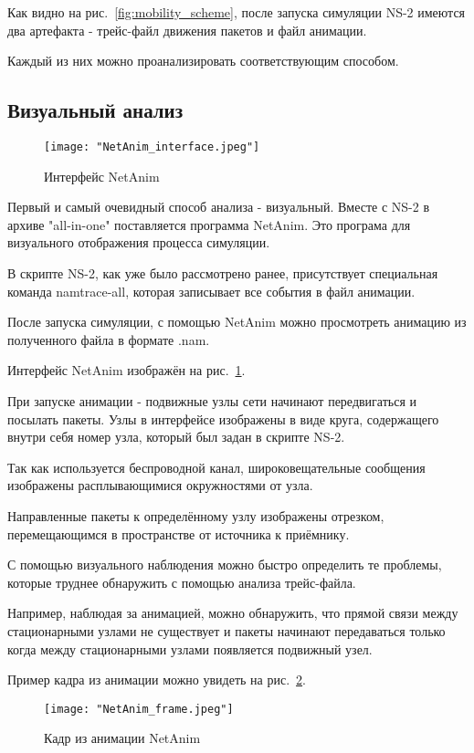 Как видно на рис.~\ref{fig:mobility_scheme}, после запуска симуляции NS-2 имеются два артефакта - трейс-файл движения пакетов и файл анимации.

Каждый из них можно проанализировать соответствующим способом. 

\subsection*{Визуальный анализ}

\begin{figure}[!h]
  \centering
  \texttt{[image: "NetAnim\_interface.jpeg"]}
  \caption{Интерфейс NetAnim}
  \label{fig:netanim_interface}
\end{figure}

Первый и самый очевидный способ анализа - визуальный. Вместе с NS-2 в архиве "all-in-one" поставляется программа NetAnim. Это програма для визуального отображения процесса симуляции.

В скрипте NS-2, как уже было рассмотрено ранее, присутствует специальная команда namtrace-all, которая записывает все события в файл анимации. 

После запуска симуляции, с помощью NetAnim можно просмотреть анимацию из полученного файла в формате .nam.

Интерфейс NetAnim изображён на рис.~\ref{fig:netanim_interface}.

При запуске анимации - подвижные узлы сети начинают передвигаться и посылать пакеты. Узлы в интерфейсе изображены в виде круга, содержащего внутри себя номер узла, который был задан в скрипте NS-2. 

Так как используется беспроводной канал, широковещательные сообщения изображены расплывающимися окружностями от узла. 

Направленные пакеты к определённому узлу изображены отрезком, перемещающимся в пространстве от источника к приёмнику.

С помощью визуального наблюдения можно быстро определить те проблемы, которые труднее обнаружить с помощью анализа трейс-файла. 

Например, наблюдая за анимацией, можно обнаружить, что прямой связи между стационарными узлами не существует и пакеты начинают передаваться только когда между стационарными узлами появляется подвижный узел.

Пример кадра из анимации можно увидеть на рис.~\ref{fig:netanim_frame}.

\begin{figure}[!h]
  \centering
  \texttt{[image: "NetAnim\_frame.jpeg"]}
  \caption{Кадр из анимации NetAnim}
  \label{fig:netanim_frame}
\end{figure}

